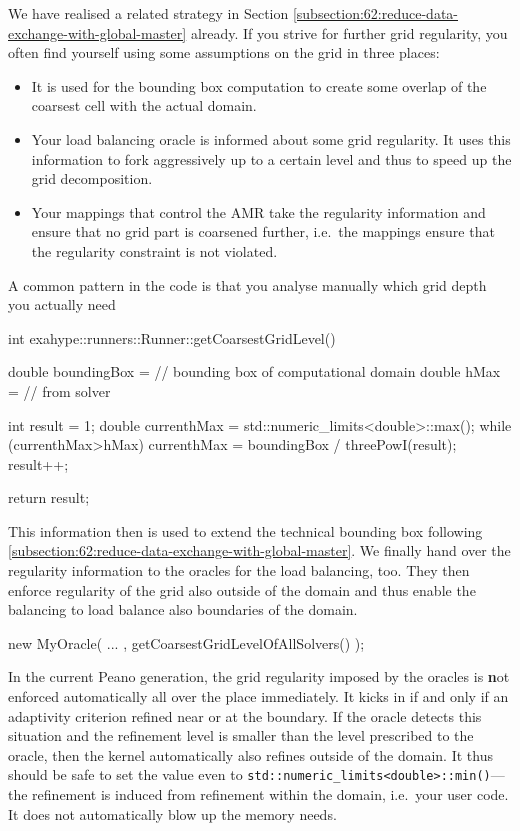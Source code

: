 {We have realised a related strategy in Section
\ref{subsection:62:reduce-data-exchange-with-global-master} already. 
If you strive for further grid regularity, you often find yourself using some
assumptions on the grid in three places:
\begin{itemize}
  \item It is used for the bounding box computation to create some overlap of
  the coarsest cell with the actual domain.
  \item Your load balancing oracle is informed about some grid regularity. It
  uses this information to fork aggressively up to a certain level and thus to
  speed up the grid decomposition.
  \item Your mappings that control the AMR take the regularity information and
  ensure that no grid part is coarsened further, i.e.~the mappings ensure that
  the regularity constraint is not violated.
\end{itemize}

\noindent
A common pattern in the code is that you analyse manually which grid depth you
actually need
\begin{code}
int exahype::runners::Runner::getCoarsestGridLevel() {
  double boundingBox =  // bounding box of computational domain
  double hMax        =  // from solver

  int    result      = 1;
  double currenthMax = std::numeric_limits<double>::max();
  while (currenthMax>hMax) {
    currenthMax = boundingBox / threePowI(result);
    result++;
  }

  return result;
}
\end{code}

\noindent
This information then is used to extend the technical bounding box following  
\ref{subsection:62:reduce-data-exchange-with-global-master}.
We finally hand over the regularity information to the oracles for the load
balancing, too.
They then enforce regularity of the grid also outside of the domain and thus
enable the balancing to load balance also boundaries of the domain.
\begin{code}
  new MyOracle( ... , getCoarsestGridLevelOfAllSolvers() );
\end{code}


\begin{remark}
In the current Peano generation, the grid regularity imposed by the oracles is
{\textbf not} enforced automatically all over the place immediately. 
It kicks in if and only if an adaptivity criterion refined near or at the
boundary. 
If the oracle detects this situation and the refinement level is smaller than
the level prescribed to the oracle, then the kernel automatically also refines
outside of the domain.
It thus should be safe to set the value even to
\texttt{std::numeric\_limits\textless double\textgreater ::min()}---the
refinement is induced from refinement within the domain, i.e.~your user code.
It does not automatically blow up the memory needs.
\end{remark}


}
